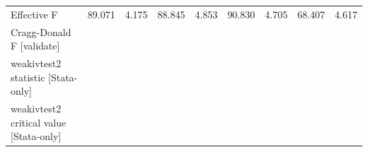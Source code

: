 \begin{tabular}{lcccccccc}
\hline
Effective F & 89.071 & 4.175 & 88.845 & 4.853 & 90.830 & 4.705 & 68.407 & 4.617 \\
Cragg-Donald F [validate] &  &  &  &  &  &  &  &  \\
weakivtest2 statistic [Stata-only] &  &  &  &  &  &  &  &  \\
weakivtest2 critical value [Stata-only] &  &  &  &  &  &  &  &  \\
\hline
\end{tabular}
